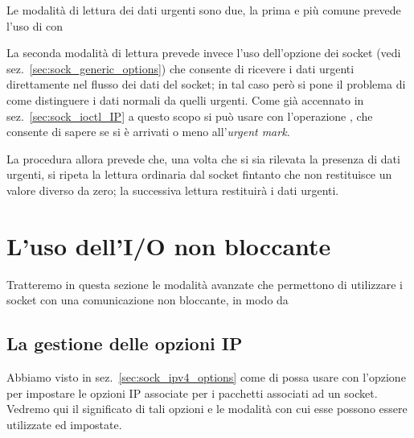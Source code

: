 Le modalità di lettura dei dati urgenti sono due, la prima e più comune
prevede l'uso di  con 



La seconda modalità di lettura prevede invece l'uso dell'opzione dei socket
 (vedi sez.~\ref{sec:sock_generic_options}) che consente
di ricevere i dati urgenti direttamente nel flusso dei dati del socket; in tal
caso però si pone il problema di come distinguere i dati normali da quelli
urgenti. Come già accennato in sez.~\ref{sec:sock_ioctl_IP} a questo scopo si
può usare  con l'operazione , che consente di
sapere se si è arrivati o meno all'\textit{urgent mark}. 

La procedura allora prevede che, una volta che si sia rilevata la presenza di
dati urgenti, si ripeta la lettura ordinaria dal socket fintanto che
 non restituisce un valore diverso da zero; la successiva
lettura restituirà i dati urgenti.






\section{L'uso dell'I/O non bloccante}
\label{sec:sock_noblok_IO}

Tratteremo in questa sezione le modalità avanzate che permettono di utilizzare
i socket con una comunicazione non bloccante, in modo da 





\subsection{La gestione delle opzioni IP}  
\label{sec:sock_IP_options}  

Abbiamo visto in sez.~\ref{sec:sock_ipv4_options} come di possa usare  
 con l'opzione  per impostare le opzioni  
IP associate per i pacchetti associati ad un socket.  Vedremo qui il
significato di tali opzioni e le modalità con cui esse possono essere
utilizzate ed impostate.


